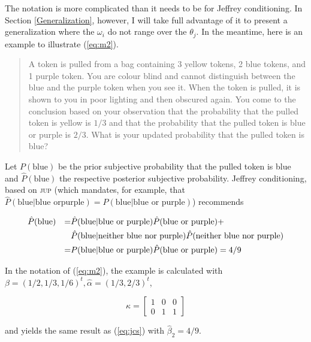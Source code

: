 \documentclass[entropy,article,submit,oneauthor,pdftex,12pt,a4paper]{mdpi}
\newenvironment{quotex}{\begin{quote}\begin{footnotesize}}{\end{footnotesize}\end{quote}}
\begin{document}
{\noindent}The notation is more complicated than it needs to be for Jeffrey
conditioning. In Section \ref{Generalization}, however, I will take
full advantage of it to present a generalization where the
$\omega_{i}$ do not range over the $\theta_{j}$. In the meantime, here
is an example to illustrate (\ref{eq:m2}).

\begin{quotex}
  A token is pulled from a bag containing 3 yellow tokens, 2 blue
  tokens, and 1 purple token. You are colour blind and cannot
  distinguish between the blue and the purple token when you see it.
  When the token is pulled, it is shown to you in poor lighting and
  then obscured again. You come to the conclusion based on your
  observation that the probability that the pulled token is yellow is
  $1/3$ and that the probability that the pulled token is blue or
  purple is $2/3$. What is your updated probability that the pulled
  token is blue?
\end{quotex}

{\noindent}Let $P(\mbox{blue})$ be the prior subjective probability
that the pulled token is blue and $\hat{P}(\mbox{blue})$ the
respective posterior subjective probability. Jeffrey conditioning,
based on \textsc{jup} (which mandates, for example, that
$\hat{P}(\mbox{blue}|\mbox{blue or}\mbox{
  purple})=P(\mbox{blue}|\mbox{blue or purple})$) recommends

\begin{align}
  \label{eq:jcs}
&\hat{P}(\mbox{blue})&=&\hat{P}(\mbox{blue}|\mbox{blue or purple})\hat{P}(\mbox{blue or
  purple})+\notag \\
&&&\hat{P}(\mbox{blue}|\mbox{neither blue nor
  purple})\hat{P}(\mbox{neither blue nor purple})\notag \\
&&=&P(\mbox{blue}|\mbox{blue or purple})\hat{P}(\mbox{blue or
  purple})=4/9
\end{align}

{\noindent}In the notation of (\ref{eq:m2}), the example is calculated
with $\beta=(1/2,1/3,1/6)^{t},\hat{\alpha}=(1/3,2/3)^{t}$,

\begin{equation}
  \label{eq:kappa}
  \kappa=\left[
  \begin{array}{ccc}
    1 & 0 & 0 \\
    0 & 1 & 1
  \end{array}\right]
\end{equation}

{\noindent}and yields the same result as (\ref{eq:jcs}) with
$\hat{\beta}_{2}=4/9$.
\end{document}
